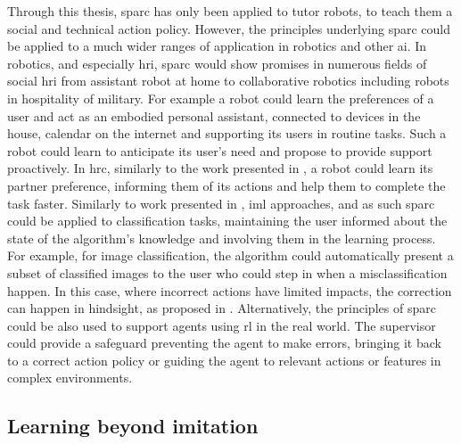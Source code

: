 Through this thesis, \gls{sparc} has only been applied to tutor robots, to teach them a social and technical action policy. However, the principles underlying \gls{sparc} could be applied to a much wider ranges of application in robotics and other \gls{ai}. In robotics, and especially \gls{hri}, \gls{sparc} would show promises in numerous fields of social \gls{hri} from assistant robot at home to collaborative robotics including robots in hospitality of military. For example a robot could learn the preferences of a user and act as an embodied personal assistant, connected to  devices in the house, calendar on the internet and supporting its users in routine tasks. Such a robot could learn to anticipate its user's need and propose to provide support proactively. In \gls{hrc}, similarly to the work presented in \cite{munzer2017efficient}, a robot could learn its partner preference, informing them of its actions and help them to complete the task faster. Similarly to work presented in \cite{feil2005defining}, \gls{iml} approaches, and as such \gls{sparc} could be applied to classification tasks, maintaining the user informed about the state of the algorithm's knowledge and involving them in the learning process. For example, for image classification, the algorithm could automatically present a subset of classified images to the user who could step in when a misclassification happen. In this case, where incorrect actions have limited impacts, the correction can happen in hindsight, as proposed in \cite{chernova2009interactive}. Alternatively, the principles of \gls{sparc} could be also used to support agents using \gls{rl} in the real world. The supervisor could provide a safeguard preventing the agent to make errors, bringing it back to a correct action policy or guiding the agent to relevant actions or features in complex environments.


\subsection{Learning beyond imitation}

